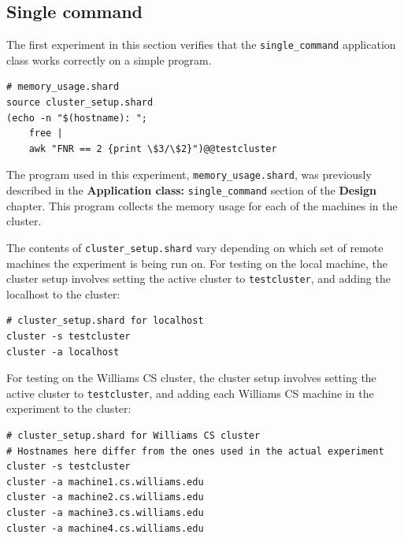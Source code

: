 \documentclass[oneside]{report}
\newcommand{\todoi}[1]{\todo[inline, color=blue!20]{TODO: {#1}}}
\begin{document}

\subsection{Single command}
\begin{sloppypar}
  The first experiment in this section verifies that the \texttt{single\_command} application class works correctly on a simple program.
\end{sloppypar}

\begin{minipage}[c]{\textwidth-15pt}
  \begin{lstlisting}[language=Shard]
# memory_usage.shard
source cluster_setup.shard
(echo -n "$(hostname): ";
    free |
    awk "FNR == 2 {print \$3/\$2}")@@testcluster
\end{lstlisting}
  \smallskip
\end{minipage}

The program used in this experiment, \texttt{memory\_usage.shard}, was previously described in the \textbf{Application class: }\texttt{single\_command} section of the \textbf{Design} chapter.
This program collects the memory usage for each of the machines in the cluster.

The contents of \texttt{cluster\_setup.shard} vary depending on which set of remote machines the experiment is being run on.
For testing on the local machine, the cluster setup involves setting the active cluster to \texttt{testcluster}, and adding the localhost to the cluster:

\begin{minipage}[c]{\textwidth-15pt}
  \begin{lstlisting}[language=Shard]
# cluster_setup.shard for localhost
cluster -s testcluster
cluster -a localhost
\end{lstlisting}
  \smallskip
\end{minipage}

\begin{sloppypar}
  For testing on the Williams CS cluster, the cluster setup involves setting the active cluster to \texttt{testcluster}, and adding each Williams CS machine in the experiment to the cluster:
\end{sloppypar}

\begin{minipage}[c]{\textwidth-15pt}
  \begin{lstlisting}[language=Shard]
# cluster_setup.shard for Williams CS cluster
# Hostnames here differ from the ones used in the actual experiment
cluster -s testcluster
cluster -a machine1.cs.williams.edu
cluster -a machine2.cs.williams.edu
cluster -a machine3.cs.williams.edu
cluster -a machine4.cs.williams.edu
\end{lstlisting}
  \smallskip
\end{minipage}
\end{document}
